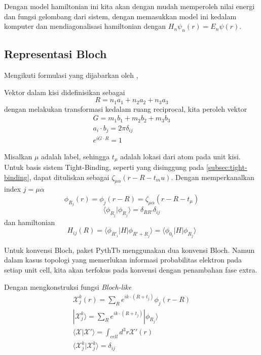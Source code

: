 \par
Dengan model hamiltonian ini kita akan dengan mudah memperoleh nilai energi dan fungsi gelombang dari sistem, dengan memasukkan model ini kedalam komputer dan mendiagonalisasi hamiltonian dengan $H_n\psi_n(r)=E_n\psi(r)$.
\subsection{Representasi Bloch}
Mengikuti formulasi yang dijabarkan oleh \parencite{Yusufaly2013} \parencite{Cole_Python_Tight_Binding_2025},
\par 
Vektor dalam kisi didefinisikan sebagai
\[
 R = n_1 a_1 + n_2 a_2 + n_3 a_3 
\]
dengan melakukan transformasi kedalam ruang reciprocal, kita peroleh vektor
\[
\begin{align}
G = m_1 b_1 + m_2 b_2 + m_3 b_3 \\
a_i \cdot b_j = 2 \pi \delta_{ij} \\
e^{i G \cdot R} = 1
\end{align}
\]
\par
Misalkan $\mu$ adalah label, sehingga $t_\mu$ adalah lokasi dari atom pada unit kisi. Untuk basis sistem Tight-Binding, seperti yang disinggung pada \ref{subsec:tight-binding}, dapat dituliskan sebagai $\zeta_{\mu\alpha}(r-R-t_mu)$. Dengan memperkanalkan index $j=\mu\alpha$
\[
\phi_{R_j} (r) = \phi_j (r - R) = \zeta_{\mu \alpha}(r - R - t_{\mu})
\]
\[
\langle \phi_{R_j}| \phi_{R_j} \rangle = \delta_{RR'}\delta_{ij}
\]
dan hamiltonian
\[
H_{ij}(R) = \langle \phi_{R'_i}|H| \phi_{R' + R_j} \rangle = \langle \phi_{0_i}|H| \phi_{R_j} \rangle 
\]
\par 
Untuk konvensi Bloch, paket PythTb \parencite{Cole_Python_Tight_Binding_2025} \parencite{Coh2022} menggunakan dua konvensi Bloch. Namun dalam kasus topologi yang memerlukan informasi probabilitas elektron pada setiap unit cell, kita akan terfokus pada konvensi dengan penambahan fase extra.
\par
Dengan mengkonstruksi fungsi \textit{Bloch-like}
\[
\begin{align}
\mathcal{X}^k_j(r) = \sum_R e^{i k \cdot (R + t_j)} \phi_j(r - R) \\
|\mathcal{X}^k_j \rangle = \sum_R e^{i k \cdot (R + t_j)} |\phi_{R_j}\rangle \\
\langle \mathcal{X}|\mathcal{X'} \rangle = \int_{cell} d^3 r \mathcal{X}'(r) \\
\langle\mathcal{X}^k_j |\mathcal{X}^k_j \rangle = \delta_{ij}
\end{align}
\]
